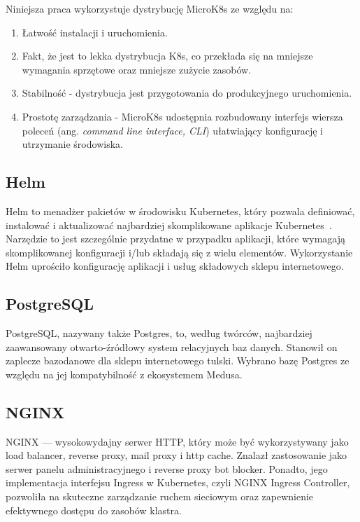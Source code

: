 \noindent Niniejsza praca wykorzystuje dystrybucję MicroK8s\cite{microk8s-docs-home} ze względu na:
\begin{enumerate}
    \item Łatwość instalacji i uruchomienia.
    \item Fakt, że jest to lekka dystrybucja K8s, co przekłada się na mniejsze wymagania sprzętowe oraz mniejsze zużycie zasobów.
    \item Stabilność - dystrybucja jest przygotowania do produkcyjnego uruchomienia.
    \item Prostotę zarządzania - MicroK8s udostępnia rozbudowany interfejs wiersza poleceń (ang. \emph{command line interface, CLI}) ułatwiający konfigurację i utrzymanie środowiska.
\end{enumerate}

\subsection{Helm}\label{subsec:helm}

Helm to menadżer pakietów w środowisku Kubernetes, który pozwala definiować, instalować i aktualizować najbardziej skomplikowane aplikacje Kubernetes~\cite{helm-home}.
Narzędzie to jest szczególnie przydatne w przypadku aplikacji, które wymagają skomplikowanej konfiguracji i/lub składają się z wielu elementów.
Wykorzystanie Helm uprościło konfigurację aplikacji i usług składowych sklepu internetowego.

\subsection{PostgreSQL}\label{subsec:postgresql}

PostgreSQL, nazywany także Postgres, to, według twórców, najbardziej zaawansowany otwarto-źródłowy system relacyjnych baz danych\cite{postgresql-home}.
Stanowił on zaplecze bazodanowe dla sklepu internetowego tulski.
Wybrano bazę Postgres ze względu na jej kompatybilność z ekosystemem Medusa.

\subsection{NGINX}\label{subsec:nginx}

NGINX --- wysokowydajny serwer HTTP, który może być wykorzystywany jako load balancer, reverse proxy, mail proxy i http cache.
Znalazł zastosowanie jako serwer panelu administracyjnego i reverse proxy bot blocker.
Ponadto, jego implementacja interfejsu Ingress w Kubernetes, czyli NGINX Ingress Controller, pozwoliła na skuteczne zarządzanie ruchem sieciowym oraz zapewnienie efektywnego dostępu do zasobów klastra.

